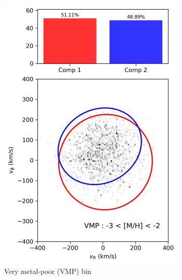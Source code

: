 \documentclass[a4paper,10pt]{article}
\begin{document}
\begin{multicols}{2}
\begin{figure}[H]
  \begin{subfigure}[t]{0.48\linewidth}
    \includegraphics[width=\linewidth]{../figures/gmm_VMP.png}
    \caption{Very metal-poor (VMP) bin}
    \label{fig:gmm_vmp}
  \end{subfigure}
  \hfill
  \begin{subfigure}[t]{0.48\linewidth}

\end{subfigure}
\end{figure}
\end{multicols}
\end{document}
